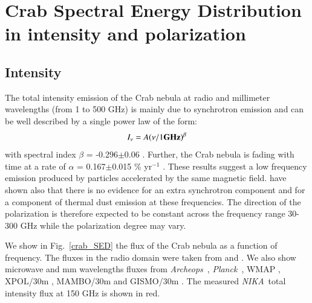 \documentclass[twocolumn,traditabstract]{aa}
\def\NIKA{\textit{NIKA}}
\def\Archeops{\textit{Archeops}}
\def\Planck{\textit{Planck}}
\begin{document}
\section{Crab Spectral Energy Distribution in intensity and polarization}\label{sec:Polarization intensity Spectral Energy Density (SED)}
\subsection{Intensity}
The total intensity emission of the Crab nebula at radio and millimeter
wavelengths (from 1 to 500 GHz) is mainly due to synchrotron emission and can be
well described by a single power law of the form:
\begin{equation}
I_{\nu} = A(\nu / 1 {\bf GHz})^{\beta}
\end{equation}\label{eq:sync}
with spectral index $\beta$ = -0.296$\pm$0.06 \citep{baars1977absolute,macias2010}. Further, the Crab nebula is fading with time at a rate of $\alpha$ = 0.167$\pm$0.015 \% yr$^{-1}$ \citep{aller1985decrease}. 
These results suggest a low frequency emission produced by particles accelerated by the same magnetic field. \cite{macias2010} have shown also that there is no evidence for an extra synchrotron component and for a component of thermal dust emission at these frequencies. The direction of the polarization is therefore expected to be constant across the frequency range 30-300 GHz while the polarization degree may vary.

We show in Fig.~\ref{crab_SED} the flux of the Crab nebula as a function of frequency. The fluxes in the radio domain were taken from \cite{dmitrenko1970absolute} and \cite{1971IzVUZ..14..157V}. We also show microwave and mm wavelengths fluxes from \Archeops\ \citep{macias2007archeops}, \Planck\ \citep{2015arXiv150702058P}, WMAP \citep{2011ApJS..192...19W}, XPOL/30m \citep{aumont2010}, MAMBO/30m \citep{2002A&A...386.1044B} and GISMO/30m \citep{2011ApJ...734...54A}. The measured \NIKA\ total intensity flux at 150 GHz is shown in red.
\end{document}

